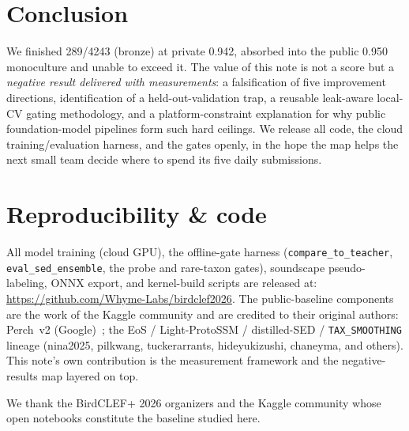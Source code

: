 \documentclass{ceurart}
\begin{document}
\section{Conclusion}
\label{sec:conclusion}

We finished 289/4243 (bronze) at private 0.942, absorbed into the public 0.950
monoculture and unable to exceed it. The value of this note is not a score but a
\emph{negative result delivered with measurements}: a falsification of five
improvement directions, identification of a held-out-validation trap, a reusable
leak-aware local-CV gating methodology, and a platform-constraint explanation for
why public foundation-model pipelines form such hard ceilings. We release all code,
the cloud training/evaluation harness, and the gates openly, in the hope the map
helps the next small team decide where to spend its five daily submissions.

\section*{Reproducibility \& code}
\label{sec:repro}

All model training (cloud GPU), the offline-gate harness
(\texttt{compare\_to\_teacher}, \texttt{eval\_sed\_ensemble}, the probe and
rare-taxon gates), soundscape pseudo-labeling, ONNX export, and kernel-build
scripts are released at: \url{https://github.com/Whyme-Labs/birdclef2026}. The
public-baseline components are the work of the Kaggle community and are credited to
their original authors: Perch~v2 (Google)~\cite{perch}; the EoS / Light-ProtoSSM /
distilled-SED / \texttt{TAX\_SMOOTHING} lineage (nina2025, pilkwang, tuckerarrants,
hideyukizushi, chaneyma, and others). This note's own contribution is the
measurement framework and the negative-results map layered on top.

\begin{acknowledgments}
We thank the BirdCLEF+ 2026 organizers and the Kaggle community whose open
notebooks constitute the baseline studied here.
\end{acknowledgments}

\end{document}
